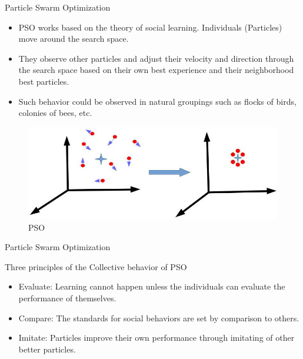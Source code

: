 \documentclass[table]{beamer}
\begin{document}
	\begin{frame}{Particle Swarm Optimization}
		\begin{block}{}
			\justifying
			\begin{itemize}
				\item PSO works based on the theory of social learning. Individuals (Particles) move around the search space.
				\item They observe other particles and adjust their velocity and direction through the search space based on their own best experience and their neighborhood best particles. 
				\item Such behavior could be observed in natural groupings such as flocks of birds, colonies of bees, etc.
			\end{itemize}
		\end{block}
		\begin{figure}[v]
			\includegraphics[scale=0.4]{pso1}
			\centering
			\caption{PSO}
			\label{ref:pso1}
		\end{figure}
	\end{frame}

	\begin{frame}{Particle Swarm Optimization}
		\begin{block}{Three principles of the Collective behavior of PSO}
			\begin{itemize}
				\item Evaluate: Learning cannot happen unless the individuals can evaluate the performance of themselves.
				\item Compare: The standards for social behaviors are set by comparison to others.
				\item Imitate: Particles improve their own performance through imitating of other better particles.
			\end{itemize}
		\end{block}
	\end{frame}
\end{document}
